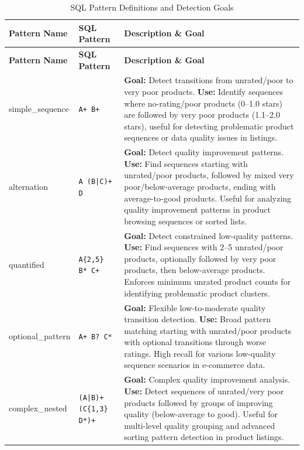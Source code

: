 {\small
\setlength{\LTleft}{0pt}
\setlength{\LTright}{0pt}
\begin{longtable}{@{\extracolsep{\fill}}llp{}}
\caption{SQL Pattern Definitions and Detection Goals}
\label{tab:pattern_definitions} \\
\toprule
\textbf{Pattern Name} & \textbf{SQL Pattern} & \textbf{Description \& Goal} \\
\midrule
\endfirsthead
\toprule
\textbf{Pattern Name} & \textbf{SQL Pattern} & \textbf{Description \& Goal} \\
\midrule
\endhead
\bottomrule
\endfoot

simple\_sequence & \texttt{A+ B+} &
\textbf{Goal:} Detect transitions from unrated/poor to very poor products.
\newline
\textbf{Use:} Identify sequences where no-rating/poor products (0--1.0
stars) are followed by very poor products (1.1--2.0 stars), useful for
detecting problematic product sequences or data quality issues in
listings. \\
\midrule

alternation & \texttt{A (B|C)+ D} &
\textbf{Goal:} Detect quality improvement patterns.
\newline
\textbf{Use:} Find sequences starting with unrated/poor products,
followed by mixed very poor/below-average products, ending with
average-to-good products.  Useful for analyzing quality improvement
patterns in product browsing sequences or sorted lists. \\
\midrule

quantified & \texttt{A\{2,5\} B* C+} &
\textbf{Goal:} Detect constrained low-quality patterns.
\newline
\textbf{Use:} Find sequences with 2--5 unrated/poor products,
optionally followed by very poor products, then below-average products.
Enforces minimum unrated product counts for identifying problematic
product clusters. \\
\midrule

optional\_pattern & \texttt{A+ B? C*} &
\textbf{Goal:} Flexible low-to-moderate quality transition detection.
\newline
\textbf{Use:} Broad pattern matching starting with unrated/poor
products with optional transitions through worse ratings.  High recall
for various low-quality sequence scenarios in e-commerce data. \\
\midrule

complex\_nested & \texttt{(A|B)+ (C\{1,3\} D*)+} &
\textbf{Goal:} Complex quality improvement analysis.
\newline
\textbf{Use:} Detect sequences of unrated/very poor products followed
by groups of improving quality (below-average to good).  Useful for
multi-level quality grouping and advanced sorting pattern detection in
product listings. \\
\end{longtable}
}

